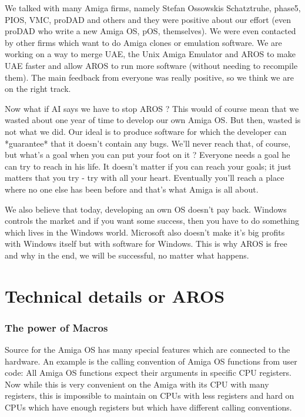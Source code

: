 We talked with many Amiga firms, namely Stefan Ossowskis Schatztruhe,
phase5, PIOS, VMC, proDAD and others and they were positive about our
effort (even proDAD who write a new Amiga OS, pOS, themselves). We were even
contacted by other firms which want to do Amiga clones or emulation
software. We are working on a way to merge UAE, the Unix Amiga Emulator and
AROS to make UAE faster and allow AROS to run more software (without
needing to recompile them). The main feedback from everyone was really
positive, so we think we are on the right track.

Now what if AI says we have to stop AROS ? This would of course mean that
we wasted about one year of time to develop our own Amiga OS. But then,
wasted is not what we did. Our ideal is to produce software for which the
developer can *guarantee* that it doesn't contain any bugs. We'll never
reach that, of course, but what's a goal when you can put your foot on it ?
Everyone needs a goal he can try to reach in his life. It doesn't matter if
you can reach your goals; it just matters that you try - try with all your
heart. Eventually you'll reach a place where no one else has been before
and that's what Amiga is all about.

We also believe that today, developing an own OS doesn't pay back. Windows
controls the market and if you want some success, then you have to do
something which lives in the Windows world. Microsoft also doesn't make
it's big profits with Windows itself but with software for Windows. This is
why AROS is free and why in the end, we will be successful, no matter what
happens.

\part{Technical details or AROS}

\section{The power of Macros}

Source for the Amiga OS has many special features which are connected to the
hardware. An example is the calling convention of Amiga OS functions from
user code: All Amiga OS functions expect their arguments in specific CPU
registers. Now while this is very convenient on the Amiga with its CPU with
many registers, this is impossible to maintain on CPUs with less registers
and hard on CPUs which have enough registers but which have different
calling conventions.

